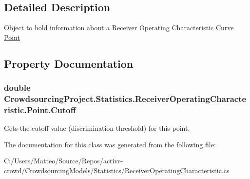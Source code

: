 \subsection{Detailed Description}
Object to hold information about a Receiver Operating Characteristic Curve \hyperlink{class_crowdsourcing_project_1_1_statistics_1_1_receiver_operating_characteristic_1_1_point}{Point} 



\subsection{Property Documentation}
\hypertarget{class_crowdsourcing_project_1_1_statistics_1_1_receiver_operating_characteristic_1_1_point_aba21bd4e1ac0f108580c8387eb8a933d}{}
\subsubsection[{Cutoff}]{\setlength{\rightskip}{0pt plus 5cm}double Crowdsourcing\+Project.\+Statistics.\+Receiver\+Operating\+Characteristic.\+Point.\+Cutoff\hspace{0.3cm}{\ttfamily [get]}}\label{class_crowdsourcing_project_1_1_statistics_1_1_receiver_operating_characteristic_1_1_point_aba21bd4e1ac0f108580c8387eb8a933d}


Gets the cutoff value (discrimination threshold) for this point. 



The documentation for this class was generated from the following file\+:\begin{DoxyCompactItemize}
\item 
C\+:/\+Users/\+Matteo/\+Source/\+Repos/active-\/crowd/\+Crowdsourcing\+Models/\+Statistics/Receiver\+Operating\+Characteristic.\+cs\end{DoxyCompactItemize}
